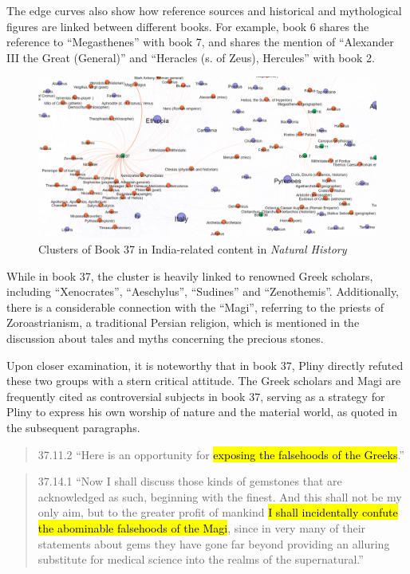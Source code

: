 \documentclass[
  12pt,
]{article}
\begin{document}
The edge curves also show how reference sources and historical and
mythological figures are linked between different books. For example,
book 6 shares the reference to ``Megasthenes'' with book 7, and shares
the mention of ``Alexander III the Great (General)'' and ``Heracles (s.
of Zeus), Hercules'' with book 2.

\begin{figure}

{\centering \includegraphics{NHthesis_structure_files/figure-pdf/fig-network_zoom_book37-output-1.png}

}

\caption{\label{fig-network_zoom_book37}Clusters of Book 37 in
India-related content in \emph{Natural History}}

\end{figure}

While in book 37, the cluster is heavily linked to renowned Greek
scholars, including ``Xenocrates'', ``Aeschylus'', ``Sudines'' and
``Zenothemis''. Additionally, there is a considerable connection with
the ``Magi'', referring to the priests of Zoroastrianism, a traditional
Persian religion, which is mentioned in the discussion about tales and
myths concerning the precious stones.

Upon closer examination, it is noteworthy that in book 37, Pliny
directly refuted these two groups with a stern critical attitude. The
Greek scholars and Magi are frequently cited as controversial subjects
in book 37, serving as a strategy for Pliny to express his own worship
of nature and the material world, as quoted in the subsequent
paragraphs.

\begin{quote}
37.11.2 ``Here is an opportunity for
\hl{exposing the falsehoods of the Greeks}.''
\end{quote}

\begin{quote}
37.14.1 ``Now I shall discuss those kinds of gemstones that are
acknowledged as such, beginning with the finest. And this shall not be
my only aim, but to the greater profit of mankind
\hl{I shall incidentally confute the abominable falsehoods of the Magi},
since in very many of their statements about gems they have gone far
beyond providing an alluring substitute for medical science into the
realms of the supernatural.''
\end{quote}
\end{document}
